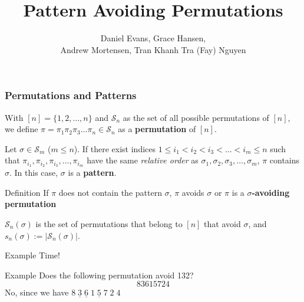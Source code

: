 \documentclass{beamer}  %
\title{Pattern Avoiding Permutations}
\author{Daniel Evans, Grace Hansen, \\Andrew Mortensen, Tran Khanh Tra (Fay) Nguyen}
\date{\null}
\begin{document}
\begin{frame}
\maketitle
\vspace{-.5 in}
\end{frame}



\begin{frame}
\frametitle{Permutations and Patterns}

With $[n] = \{1,2,\ldots,n\}$ and $\mathcal{S}_n$ as the set of all possible permutations of $[n]$, we define $\pi = \pi_1\pi_2\pi_3\ldots\pi_n \in \mathcal{S}_n$ as a \textbf{permutation} of $[n]$.

Let $\sigma \in \mathcal{S}_m$ ($m \leq n$). If there exist indices $1\leq i_1 < i_2 < i_3 < \ldots < i_m\leq n$ such that $\pi_{i_1}, \pi_{i_2}, \pi_{i_3}, \ldots, \pi_{i_m}$ have the same \textit{relative order} as $\sigma_1, \sigma_2, \sigma_3, \ldots, \sigma_m$, $\pi$ contains $\sigma$. In this case, $\sigma$ is a \textbf{pattern}.

\begin{block}{Definition}
     If $\pi$ does not contain the pattern $\sigma$, $\pi$ avoids $\sigma$ or $\pi$ is a \textbf{$\sigma$-avoiding permutation}
\end{block}

 $\mathcal{S}_n(\sigma)$ is the set of permutations that belong to $[n]$ that avoid $\sigma$, and $s_n(\sigma):=|\mathcal{S}_n(\sigma)|$.

\end{frame}

\begin{frame}{Example Time!}
    \begin{alertblock}{Example}
    Does the following permutation avoid 132?
    $$83615724$$
    \vspace{1mm}
    \pause
    No, since we have $8\;\underline{3}\;\underline{6}\;1\;\underline{5}\;7\;2\;4$
    \end{alertblock}
\end{frame}
\end{document}
